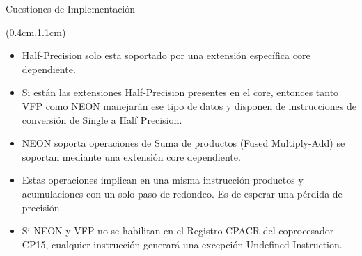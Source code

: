 \begin{frame}{Cuestiones de Implementación}
 \begin{textblock*}{\textwidth}(0.4cm,1.1cm)
  \begin{itemize}[<+->]\justifying
   \item Half-Precision solo esta soportado por una extensión específica core dependiente.
   \item Si están las extensiones Half-Precision presentes en el core, entonces tanto VFP como NEON manejarán ese tipo de datos y disponen de instrucciones de conversión de Single a Half Precision.
   \item NEON soporta operaciones de Suma de productos (Fused Multiply-Add) se soportan mediante una extensión core dependiente.
   \item Estas operaciones implican en una misma instrucción productos y acumulaciones con un solo paso de redondeo. Es de esperar una pérdida de precisión.
   \item Si NEON y VFP no se habilitan en el Registro CPACR del coprocesador CP15, cualquier instrucción generará una excepción Undefined Instruction.
  \end{itemize}
 \end{textblock*} 
\end{frame}


